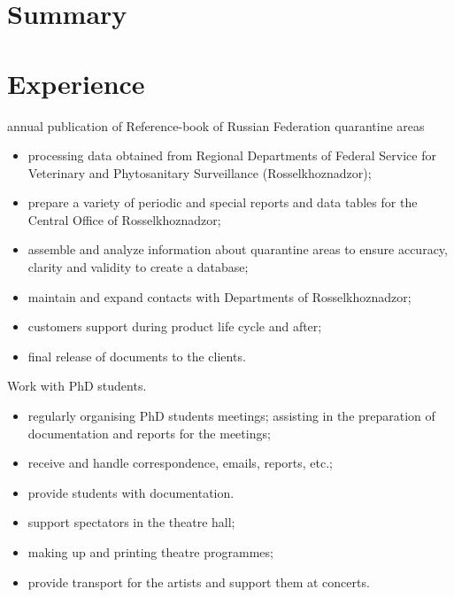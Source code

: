 \documentclass[11pt, a4paper]{moderncv}
\begin{document}
\makecvtitle
\vspace*{-5mm}

\section{Summary}




\section{Experience}

	{annual publication of Reference-book of Russian Federation quarantine areas
	\begin{itemize}
	\item processing data obtained from Regional Departments of Federal Service for Veterinary and Phytosanitary Surveillance (Rosselkhoznadzor);
	\item prepare a variety of periodic and special reports and data tables for the Central Office of Rosselkhoznadzor; 
	\item assemble and analyze information about quarantine areas to ensure accuracy, clarity and validity to create a database;
	\item maintain and expand contacts with Departments of Rosselkhoznadzor; 
	\item customers support during product life cycle and after;
	\item final release of documents to the clients.
	\end{itemize}}

	{Work with PhD students.
	\begin{itemize}
	\item regularly organising PhD students meetings; assisting in the preparation of documentation and reports for the meetings;
	\item receive and handle correspondence, emails, reports, etc.;
	\item provide students with documentation.
	\end{itemize}}

	{\begin{itemize}
	\item support spectators in the theatre hall;
	\item making up and printing theatre programmes;
	\item provide transport for the artists and support them at concerts.
	\end{itemize}}
\end{document}
